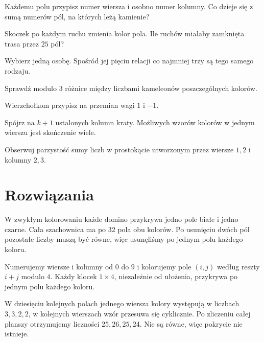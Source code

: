 \documentclass{lecture-kuznia}
\begin{document}
\begin{hint*}[\ref{Z9}]
	Każdemu polu przypisz numer wiersza i osobno numer kolumny. Co dzieje się
	z sumą numerów pól, na których leżą kamienie?
\end{hint*}

\begin{hint*}[\ref{Z10}]
	Skoczek po każdym ruchu zmienia kolor pola. Ile ruchów miałaby zamknięta
	trasa przez $25$ pól?
\end{hint*}

\begin{hint*}[\ref{Z11}]
	Wybierz jedną osobę. Spośród jej pięciu relacji co najmniej trzy są tego
	samego rodzaju.
\end{hint*}

\begin{hint*}[\ref{Z12}]
	Sprawdź modulo $3$ różnice między liczbami kameleonów poszczególnych
	kolorów.
\end{hint*}

\begin{hint*}[\ref{Z13}]
	Wierzchołkom przypisz na przemian wagi $1$ i $-1$.
\end{hint*}

\begin{hint*}[\ref{Z14}]
	Spójrz na $k+1$ ustalonych kolumn kraty. Możliwych wzorów kolorów w jednym
	wierszu jest skończenie wiele.
\end{hint*}

\begin{hint*}[\ref{Z15}]
	Obserwuj parzystość sumy liczb w prostokącie utworzonym przez wiersze
	$1,2$ i kolumny $2,3$.
\end{hint*}

\newpage
\section{Rozwiązania}

\begin{solution*}[\ref{Z1}]
	W zwykłym kolorowaniu każde domino przykrywa jedno pole białe i jedno
	czarne. Cała szachownica ma po $32$ pola obu kolorów. Po usunięciu dwóch
	pól pozostałe liczby muszą być równe, więc usunęliśmy po jednym polu
	każdego koloru.
\end{solution*}

\begin{solution*}[\ref{Z2}]
	Numerujemy wiersze i kolumny od $0$ do $9$ i kolorujemy pole $(i,j)$
	według reszty $i+j$ modulo $4$. Każdy klocek $1\times4$, niezależnie od
	ułożenia, przykrywa po jednym polu każdego koloru.

	W dziesięciu kolejnych polach jednego wiersza kolory występują w liczbach
	$3,3,2,2$, w kolejnych wierszach wzór przesuwa się cyklicznie. Po zliczeniu
	całej planszy otrzymujemy liczności $25,26,25,24$. Nie są równe, więc
	pokrycie nie istnieje.
\end{solution*}
\end{document}
